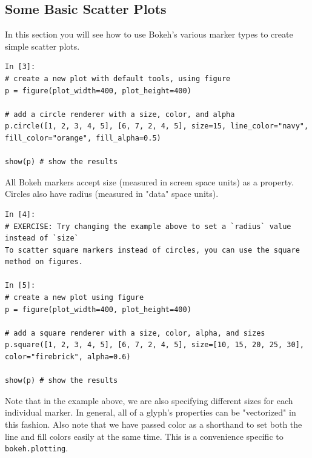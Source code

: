 \documentclass[a4paper,12pt]{article}
\begin{document}
\subsection{Some Basic Scatter Plots}
In this section you will see how to use Bokeh's various marker types to create simple scatter plots.
\begin{framed}
	\begin{verbatim}
In [3]:
# create a new plot with default tools, using figure
p = figure(plot_width=400, plot_height=400)

# add a circle renderer with a size, color, and alpha
p.circle([1, 2, 3, 4, 5], [6, 7, 2, 4, 5], size=15, line_color="navy", fill_color="orange", fill_alpha=0.5)

show(p) # show the results
\end{verbatim}
\end{framed}
All Bokeh markers accept size (measured in screen space units) as a property. Circles also have radius (measured in "data" space units).

\begin{framed}
\begin{verbatim}
In [4]:
# EXERCISE: Try changing the example above to set a `radius` value instead of `size`
To scatter square markers instead of circles, you can use the square method on figures.

In [5]:
# create a new plot using figure
p = figure(plot_width=400, plot_height=400)

# add a square renderer with a size, color, alpha, and sizes
p.square([1, 2, 3, 4, 5], [6, 7, 2, 4, 5], size=[10, 15, 20, 25, 30], color="firebrick", alpha=0.6)

show(p) # show the results
\end{verbatim}
\end{framed}
Note that in the example above, we are also specifying different sizes for each individual marker. In general, all of a glyph's properties can be "vectorized" in this fashion. Also note that we have passed color as a shorthand to set both the line and fill colors easily at the same time. This is a convenience specific to \texttt{bokeh.plotting}.
\end{document}
